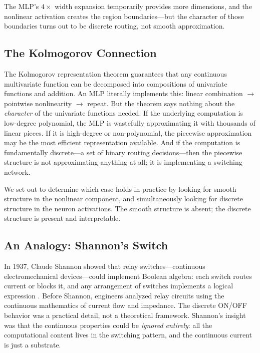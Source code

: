\documentclass{article}
\begin{document}
The MLP's $4\times$ width expansion temporarily provides more dimensions, and the nonlinear
activation creates the region boundaries---but the character of those boundaries turns out to
be discrete routing, not smooth approximation.

\subsection{The Kolmogorov Connection}

The Kolmogorov representation theorem guarantees that any continuous multivariate function can
be decomposed into compositions of univariate functions and addition. An MLP literally implements
this: linear combination $\to$ pointwise nonlinearity $\to$ repeat. But the theorem says nothing
about the \emph{character} of the univariate functions needed. If the underlying computation is
low-degree polynomial, the MLP is wastefully approximating it with thousands of linear pieces.
If it is high-degree or non-polynomial, the piecewise approximation may be the most efficient
representation available. And if the computation is fundamentally discrete---a set of binary
routing decisions---then the piecewise structure is not approximating anything at all; it is
implementing a switching network.

We set out to determine which case holds in practice by looking for smooth structure in the
nonlinear component, and simultaneously looking for discrete structure in the neuron
activations. The smooth structure is absent; the discrete structure is present and interpretable.

\subsection{An Analogy: Shannon's Switch}

In 1937, Claude Shannon showed that relay switches---continuous electromechanical devices---could
implement Boolean algebra: each switch routes current or blocks it, and any arrangement of
switches implements a logical expression \citep{shannon1938symbolic}. Before Shannon, engineers
analyzed relay circuits using the continuous mathematics of current flow and impedance. The
discrete ON/OFF behavior was a practical detail, not a theoretical framework. Shannon's
insight was that the continuous properties could be \emph{ignored entirely}: all the
computational content lives in the switching pattern, and the continuous current is just a
substrate.
\end{document}
